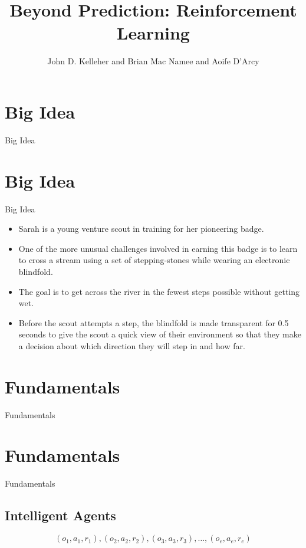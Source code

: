 \documentclass[xcolor={table}]{beamer}
\title{Beyond Prediction: Reinforcement Learning}
\author{John D. Kelleher and Brian Mac Namee and Aoife D'Arcy}
\institute{}
\date{}
\newcommand{\SectionSlide}[2][]{
	\ifthenelse{\isempty{#1}}
		{\section{#2}\begin{frame} \begin{center}\begin{huge}#2\end{huge}\end{center}\end{frame}}
		{\section[#1]{#2}\begin{frame} \begin{center}\begin{huge}#2\end{huge}\end{center}\end{frame}}
}
\begin{document}
\begin{frame}
	\titlepage
\end{frame}

\begin{frame}
	 \tableofcontents[hideallsubsections]
\end{frame}

\SectionSlide{Big Idea}

\begin{frame}
\begin{itemize}
\item Sarah is a young venture scout in training for her pioneering badge. 
\item One of the more unusual challenges involved in earning this badge is to learn to cross a stream using a set of stepping-stones while wearing an electronic blindfold. 
\item The goal is to get across the river in the fewest steps possible without getting wet. 
\item Before the scout attempts a step, the blindfold is made transparent for 0.5 seconds to give the scout a quick view of their environment so that they make a decision about which direction they will step in and how far. 
\end{itemize}
\end{frame}

\SectionSlide{Fundamentals}


\subsection{Intelligent Agents}



 \begin{frame} 
\begin{equation}
\label{eqn:episode_seq}
(o_1, a_1, r_1), (o_2, a_2, r_2), (o_3, a_3, r_3), \ldots ,(o_e, a_e, r_e)
\end{equation}
\end{frame} 
\end{document}
